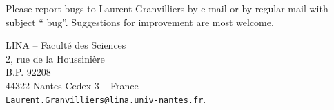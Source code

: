 

Please report bugs to Laurent Granvilliers by e-mail or by regular
mail with subject ``\Softname{} bug''. Suggestions for improvement are
most welcome.

\hspace*{30mm} LINA -- Facult\'e des Sciences\\
\hspace*{30mm} 2, rue de la Houssini\`ere\\
\hspace*{30mm} B.P. 92208\\
\hspace*{30mm} 44322 Nantes Cedex 3 -- France\\[4mm]
\hspace*{30mm} \texttt{Laurent.Granvilliers@lina.univ-nantes.fr}.
